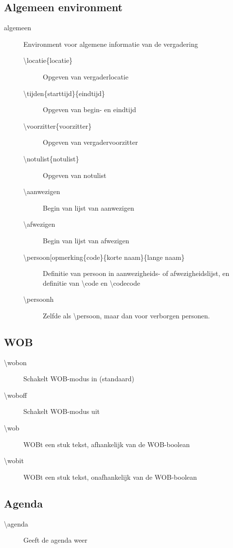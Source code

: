 \documentclass[a4paper]{notulen}
\begin{document}
		\subsection{Algemeen environment}
		\begin{description}
			\item[algemeen] Environment voor algemene informatie van de vergadering
			\begin{description}
    			\item[\textbackslash locatie\{locatie\}] Opgeven van vergaderlocatie
    			\item[\textbackslash tijden\{starttijd\}\{eindtijd\}] Opgeven van begin- en eindtijd
    			\item[\textbackslash voorzitter\{voorzitter\}] Opgeven van vergadervoorzitter
    			\item[\textbackslash notulist\{notulist\}] Opgeven van notulist
    			\item[\textbackslash aanwezigen] Begin van lijst van aanwezigen
    			\item[\textbackslash afwezigen] Begin van lijst van afwezigen
    			\item[\textbackslash persoon[opmerking\rbrack\{code\}\{korte naam\}\{lange naam\}] Definitie van persoon in aanwezigheids- of afwezigheidslijst, en definitie van \textbackslash code en \textbackslash codecode
    			\item[\textbackslash persoonh] Zelfde als \textbackslash persoon, maar dan voor verborgen personen.
 			\end{description}

		\end{description}
		\subsection{WOB}
		\begin{description}
			\item[\textbackslash wobon] Schakelt WOB-modus in (standaard)
			\item[\textbackslash woboff] Schakelt WOB-modus uit
			\item[\textbackslash wob] WOBt een stuk tekst, afhankelijk van de WOB-boolean
			\item[\textbackslash wobit] WOBt een stuk tekst, onafhankelijk van de WOB-boolean

		\end{description}
		\subsection{Agenda}
		\begin{description}
			\item[\textbackslash agenda] Geeft de agenda weer

		\end{description}
\end{document}
